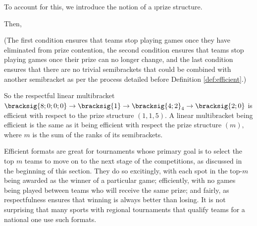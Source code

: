 {    

    To account for this, we introduce the notion of a \i{prize structure}.
    

    Then,


    (The first condition ensures that teams stop playing games once they have eliminated from prize contention, the second condition ensures that teams stop playing games once their prize can no longer change, and the last condition ensures that there are no trivial semibrackets that could be combined with another semibracket as per the process detailed before Definition \ref{def:efficient}.)

    So the respectful linear multibracket $\bracksig{8;0;0;0} \to \bracksig{1} \to \bracksig{4;2}_4 \to \bracksig{2;0}$ is efficient with respect to the prize structure $(1, 1, 5).$ A linear multibracket being efficient is the same as it being efficient with respect the prize structure $(m),$ where $m$ is the sum of the ranks of its semibrackets.

    Efficient formats are great for tournaments whose primary goal is to select the top $m$ teams to move on to the next stage of the competitions, as discussed in the beginning of this section. They do so excitingly, with each spot in the top-$m$ being awarded as the winner of a particular game; efficiently, with no games being played between teams who will receive the same prize; and fairly, as respectfulness ensures that winning is always better than losing. It is not surprising that many sports with regional tournaments that qualify teams for a national one use such formats.
}